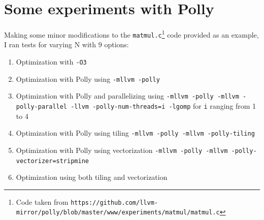 \documentclass{article}
\begin{document}
\section{Some experiments with Polly}
\begin{flushleft}
Making some minor modifications to the \texttt{matmul.c}\footnote{Code taken from \texttt{https://github.com/llvm-mirror/polly/blob/master/www/experiments/matmul/matmul.c}} code provided as an example, I ran tests for varying N with 9 options:
\begin{enumerate}
\item Optimization with \texttt{-O3}
\item Optimization with Polly using \texttt{-mllvm -polly}
\item Optimization with Polly and parallelizing using \texttt{-mllvm -polly -mllvm -polly-parallel -llvm -polly-num-threads=i -lgomp} for \texttt{i} ranging from 1 to 4
\item Optimization with Polly using tiling \texttt{-mllvm -polly -mllvm -polly-tiling}
\item Optimization with Polly using vectorization \texttt{-mllvm -polly -mllvm -polly-vectorizer=stripmine}
\item Optimization using both tiling and vectorization
\end{enumerate}


\end{flushleft}
\end{document}
